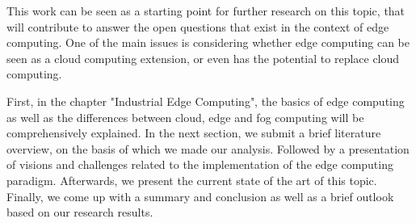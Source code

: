 This work can be seen as a starting point for further research on this topic, that will contribute to answer the open questions that exist in the context of edge computing. One of the main issues is considering whether edge computing can be seen as a cloud computing extension, or even has the potential to replace cloud computing.\par
First, in the chapter "Industrial Edge Computing", the basics of edge computing as well as  the differences between cloud, edge and fog computing will be comprehensively explained. In the next section, we submit a brief literature overview, on the basis of which we made our analysis. Followed by a presentation of visions and challenges related to the implementation of the edge computing paradigm. Afterwards, we present the current state of the art of this topic. Finally, we come up with a summary and conclusion as well as a brief outlook based on our research results.\par
{}